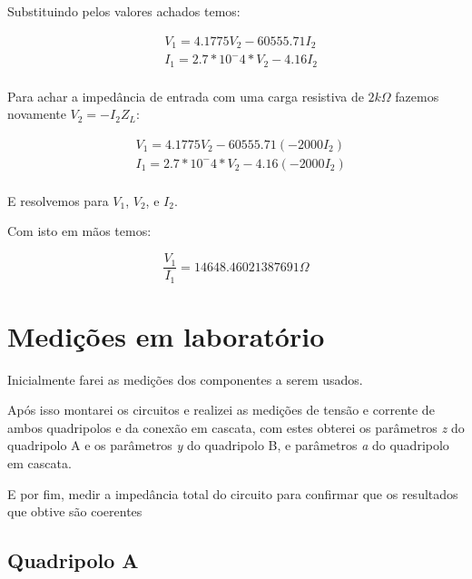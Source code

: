 \documentclass[12pt,twoside, a4paper, twocolumn]{article}
\begin{document}
Substituindo pelos valores achados temos:


\begin{equation}
    \begin{aligned}
         & V_1 = 4.1775 V_2 - 60555.71 I_2    \\
         & I_1 = 2.7 * 10^-4 * V_2 - 4.16 I_2 \\
    \end{aligned}
\end{equation}


Para achar a impedância de entrada com uma carga resistiva de $2k \varOmega$ fazemos novamente  $V_2 = -I_2 Z_L$:


\begin{equation}
    \begin{aligned}
         & V_1 = 4.1775 V_2 - 60555.71 (-2000 I_2)    \\
         & I_1 = 2.7 * 10^-4 * V_2 - 4.16 (-2000 I_2) \\
    \end{aligned}
\end{equation}


E resolvemos para $V_1$, $V_2$, e $I_2$.


Com isto em mãos temos:


\begin{equation}
    \frac{V_1}{I_1} = 14648.46021387691 \varOmega
\end{equation}




\section{Medições em laboratório}


Inicialmente farei as medições dos componentes a serem usados.


Após isso montarei os circuitos e realizei as medições de tensão e corrente de ambos quadripolos e da conexão em cascata, com estes obterei os parâmetros \emph{z} do quadripolo A e os parâmetros \emph{y} do quadripolo B, e parâmetros \emph{a} do quadripolo em cascata.


E por fim, medir a impedância total do circuito para confirmar que os resultados que obtive são coerentes




\subsection{Quadripolo A}
\end{document}
